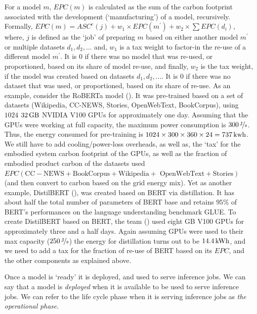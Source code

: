 {{        For a model $m$, $EPC \! \left ( m \right )$ is calculated as the sum of the carbon footprint associated with the development (`manufacturing') of a model, recursively. Formally, $EPC \! \left ( m \right ) = ASC^{e} \! \left ( j \right ) + w_{1} \times EPC \! \left ( m^{\prime} \right ) + w_2 \times \sum EPC \! \left ( d_{i} \right )$, where, $j$ is defined as the `job' of preparing $m$ based on either another model $m^{\prime}$ or multiple datasets $d_{1}, d_{2}, \dots$ and,  $w_{1}$ is a tax weight to factor-in the re-use of a different model $m^{\prime}$. It is $0$ if there was no model that was re-used, or proportioned, based on its share of model re-use, and finally, $w_{2}$ is the tax weight, if the model was created based on datasets $d_{1}, d_{2}, \dots$. It is $0$ if there was no dataset that was used, or proportioned, based on its share of re-use. As an example, consider the RoBERTa model (\cite{Liu2019}). It was pre-trained based on a set of datasets (Wikipedia, CC-NEWS, Stories, OpenWebText, BookCorpus), using $1024$ $\unit[32]{GB}$ NVIDIA V100 GPUs for approximately one day. Assuming that the GPUs were working at full capacity, the maximum power consumption is $\unitfrac[300]{J}{s}$. Thus, the energy consumed for pre-training is $1024 \times 300 \times 360 \times 24 = \unit[737]{kwh}$. We still have to add cooling/power-loss overheads, as well as, the `tax' for the embodied system carbon footprint of the GPUs, as well as the fraction of embodied product carbon of the datasets used $EPC \! \left ( \text{CC} - \text{NEWS} + \text{BookCorpus} + \text{Wikipedia} + \right .$ $ \left . \text{OpenWebText} + \text{Stories} \right )$ (and then convert to carbon based on the grid energy mix). Yet as another example, DistilBERT (\cite{Sanh2019}), was created based on BERT via distillation. It has about half the total number of parameters of BERT base and retains $95\%$ of BERT’s performances on the language understanding benchmark GLUE. To create DistilBERT based on BERT, the team (\cite{Sanh2019}) used eight \unit[16]{GB} V100 GPUs for approximately three and a half days. Again assuming GPUs were used to their max capacity ($\unitfrac[250]{J}{s}$) the energy for distillation turns out to be $\unit[14.4]{kWh}$, and we need to add a tax for the fraction of re-use of BERT based on its $EPC$, and the other components as explained above.

        Once a model is `ready' it is deployed, and used to serve inference jobs. We can say that a model is \textit{deployed} when it is available to be used to serve inference jobs. We can refer to the life cycle phase when it is serving inference jobs as \textit{the operational phase}.

}}

